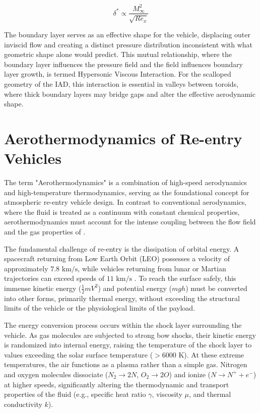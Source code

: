 \begin{equation}
    \delta^* \propto \frac{M_{\infty}^2}{\sqrt{Re_x}}
\end{equation}

The boundary layer serves as an effective shape for the vehicle, displacing outer inviscid flow and creating a distinct pressure distribution inconsistent with what geometric shape alone would predict. This mutual relationship, where the boundary layer influences the pressure field and the field influences boundary layer growth, is termed Hypersonic Viscous Interaction. For the scalloped geometry of the IAD, this interaction is essential in valleys between toroids, where thick boundary layers may bridge gaps and alter the effective aerodynamic shape.


\section{Aerothermodynamics of Re-entry Vehicles}
The term "Aerothermodynamics" is a combination of high-speed aerodynamics and high-temperature thermodynamics, serving as the foundational concept for atmospheric re-entry vehicle design. In contrast to conventional aerodynamics, where the fluid is treated as a continuum with constant chemical properties, aerothermodynamics must account for the intense coupling between the flow field and the gas properties of \cite{AndersonHypersonic}.
\par
The fundamental challenge of re-entry is the dissipation of orbital energy. A spacecraft returning from Low Earth Orbit (LEO) possesses a velocity of approximately $7.8 \text{ km/s}$, while vehicles returning from lunar or Martian trajectories can exceed speeds of $11 \text{ km/s}$ \cite{AndersonHypersonic}. To reach the surface safely, this immense kinetic energy ($\frac{1}{2}mV^2$) and potential energy ($mgh$) must be converted into other forms, primarily thermal energy, without exceeding the structural limits of the vehicle or the physiological limits of the payload.
\par
The energy conversion process occurs within the shock layer surrounding the vehicle. As gas molecules are subjected to strong bow shocks, their kinetic energy is randomized into internal energy, raising the temperature of the shock layer to values exceeding the solar surface temperature ($> 6000 \text{ K}$). At these extreme temperatures, the air functions as a plasma rather than a simple gas. Nitrogen and oxygen molecules dissociate ($N_2 \rightarrow 2N$, $O_2 \rightarrow 2O$) and ionize ($N \rightarrow N^+ + e^-$) at higher speeds, significantly altering the thermodynamic and transport properties of the fluid (e.g., specific heat ratio $\gamma$, viscosity $\mu$, and thermal conductivity $k$).
